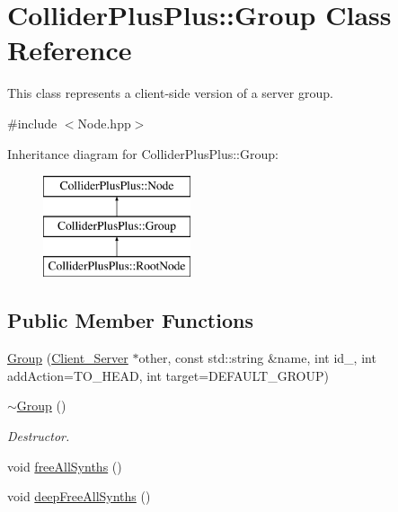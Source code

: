 \hypertarget{classColliderPlusPlus_1_1Group}{\section{Collider\-Plus\-Plus\-:\-:Group Class Reference}
\label{classColliderPlusPlus_1_1Group}
}


This class represents a client-\/side version of a server group.  




{\ttfamily \#include $<$Node.\-hpp$>$}

Inheritance diagram for Collider\-Plus\-Plus\-:\-:Group\-:\begin{figure}[H]
\begin{center}
\leavevmode
\includegraphics[height=3.000000cm]{classColliderPlusPlus_1_1Group}
\end{center}
\end{figure}
\subsection*{Public Member Functions}
\begin{DoxyCompactItemize}
\item 
\hyperlink{classColliderPlusPlus_1_1Group_aa02ffbe182d42ab7d58e64791ea1d8b8}{Group} (\hyperlink{classColliderPlusPlus_1_1Client__Server}{Client\-\_\-\-Server} $\ast$other, const std\-::string \&name, int id\-\_\-, int add\-Action=T\-O\-\_\-\-H\-E\-A\-D, int target=D\-E\-F\-A\-U\-L\-T\-\_\-\-G\-R\-O\-U\-P)
\item 
\hypertarget{classColliderPlusPlus_1_1Group_aa7f0bbd9db8735ee8dc5fdfc8c7239cf}{\hyperlink{classColliderPlusPlus_1_1Group_aa7f0bbd9db8735ee8dc5fdfc8c7239cf}{$\sim$\-Group} ()}\label{classColliderPlusPlus_1_1Group_aa7f0bbd9db8735ee8dc5fdfc8c7239cf}

\begin{DoxyCompactList}\small\item\em Destructor. \end{DoxyCompactList}\item 
void \hyperlink{classColliderPlusPlus_1_1Group_a8c19052c483b66455bcaa5fc9e82ee30}{free\-All\-Synths} ()
\item 
void \hyperlink{classColliderPlusPlus_1_1Group_ad19d4e19f0a9c71cfc4e28c587dd5c30}{deep\-Free\-All\-Synths} ()
\end{DoxyCompactItemize}


